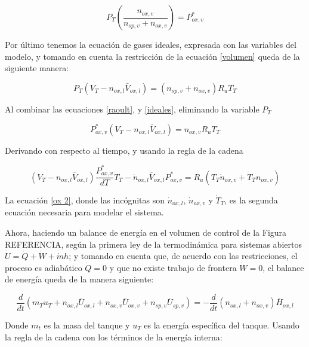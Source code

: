 \documentclass[12pt]{article}
\begin{document}
\begin{equation}
    P_{T} \left( \frac{n_{ox,v}}{n_{sp,v}+n_{ox,v}} \right) = P^{*}_{ox,v}
    \label{raoult}
\end{equation}

Por último tenemos la ecuación de gases ideales, expresada con las variables del modelo, y tomando en cuenta la restricción de la ecuación \ref{volumen} queda de la siguiente manera:

\begin{equation}
    P_{T}(V_{T} - n_{ox,l}  \bar{V}_{ox,l})=(n_{sp,v}+n_{ox,v}) R_{u} T_{T}
    \label{ideales}
\end{equation}

Al combinar las ecuaciones \ref{raoult}, y \ref{ideales}, eliminando la variable $P_{T}$

\begin{equation}
    P^{*}_{ox,v} (V_{T} - n_{ox,l} \bar{V}_{ox,l})  = n_{ox,v} R_{u} T_{T}
\end{equation}

Derivando con respecto al tiempo, y usando la regla de la cadena

\begin{equation}
    (V_{T} - n_{ox,l}\overline{V}_{ox,l}) \frac{P^{*}_{ox,v}}{dT} \dot{T}_{T} - \dot{n}_{ox,l} \overline{V}_{ox,l} P^{*}_{ox,v} = R_{u} \left( T_{T} \dot{n}_{ox,v} + \dot{T}_{T} n_{ox,v} \right)
    \label{ox 2}
\end{equation}

La ecuación \ref{ox 2}, donde las incógnitas son $\dot{n}_{ox,l}$, $\dot{n}_{ox,v}$ y $\dot{T}_{T}$, es la segunda ecuación necesaria para modelar el sistema.

Ahora, haciendo un balance de energía en el volumen de control de la Figura REFERENCIA, según la primera ley de la termodinámica para sistemas abiertos $\dot{U} = \dot{Q} + \dot{W} + \dot{m}h$; y tomando en cuenta que, de acuerdo con las restricciones, el proceso es adiabático $\dot{Q} = 0$ y que no existe trabajo de frontera $\dot{W} = 0$, el balance de energía queda de la manera siguiente:

\begin{equation}
  \frac{d}{dt}\left( m_{T} u_{T} + n_{ox,l} \overline{U}_{ox,l} + n_{ox,v} \overline{U}_{ox,v} + n_{sp,v} \overline{U}_{sp,v} \right) = -\frac{d}{dt}(n_{ox,l} + n_{ox,v})\overline{H}_{ox,l}
\end{equation}

Donde $m_{t}$ es la masa del tanque y $u_{T}$ es la energía específica del tanque. Usando la regla de la cadena con los términos de la energía interna:
\end{document}
